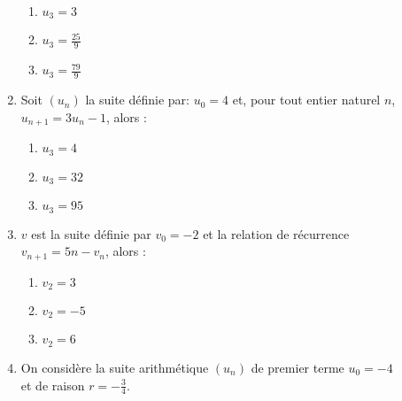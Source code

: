 \documentclass[oneside,twocolumn,landscape]{book}
\begin{document}
\begin{enumerate}
\begin{enumerate}


\item\MauvaiseReponse $u_{3}=3$


\item\BonneReponse $u_{3}=\frac{25}{9}$


\item\MauvaiseReponse $u_{3} =\frac{79}{9}$


\end{enumerate}





\item Soit $\left(u_{n}\right)$ la suite définie par: $u_{0}=4$ et, pour tout entier naturel $n$, $u_{n+1}=3 u_{n}-1$, alors :

\begin{enumerate}


\item\MauvaiseReponse $u_{3}=4$


\item\MauvaiseReponse $u_{3}=32$


\item\BonneReponse $u_{3}=95$


\end{enumerate}

\newpage


\item $v$ est la suite définie par $v_{0}=-2$ et la relation de récurrence\\ $v_{n+1}=5n-v_{n}$, alors :

\begin{enumerate}


\item\BonneReponse $v_{2}=3$


\item\MauvaiseReponse $v_{2}=-5$


\item\MauvaiseReponse $v_{2}=6$


\end{enumerate}








\item On considère la suite arithmétique $\left(u_{n}\right)$ de premier terme $u_{0}=-4$\\ et de raison $r=-\frac{3}{4}$.

\begin{enumerate}



\end{enumerate}
\end{enumerate}
\end{document}
